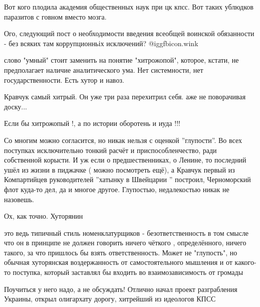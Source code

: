 \begin{itemize}
Вот кого плодила академия общественных наук при цк кпсс. Вот таких ублюдков паразитов с говном вместо мозга.

Ого, следующий пост о необходимости введения всеобщей воинской обязанности - без всяких там коррупционньіх исключений?  @igg{fbicon.wink} 


слово "умный" стоит заменить на понятие "хитрожопой", которое, кстати, не
предполагает наличие аналитического ума. Нет системности, нет
государственности. Есть хутор и навоз.

Кравчук самый хитрый. Он уже три раза перехитрил себя. аже не поворачивая доску...

Если бы хитрожопый !, а по истории оборотень и иуда !!!


Со многим можно согласится, но никак нельзя с оценкой ''глупости''. Во всех
поступках исключительно тонкий расчёт и приспособленчество, ради собственной
корысти. И уж если о предшественниках, о Ленине, то последний ушёл из жизни в
пиджачке ( можно посмотреть ещё), а Кравчук первый из Компартийцев
руководителей ''хатынку в Швейцарии '' построил, Черноморский флот куда-то
дел, да и многое другое. Глупостью, недалекостью никак не назовешь.

Ох, как точно. Хуторянин


это ведь типичный стиль номенклатурщиков - безответственность в том смысле что
он в принципе не должен говорить ничего чёткого , определённого, ничего такого,
за что пришлось бы взять ответственность. Может не "глупость", но обычная
хуторянская воздержанность от самостоятельного мышления и от какого-то
поступка, который заставлял бы входить во взаимозависимость от громады


Поучиться у него надо, а не обсуждать!
Отлично начал проект разграбления Украины, открыл олигархату дорогу, хитрейший из идеологов КПСС

\end{itemize} %
